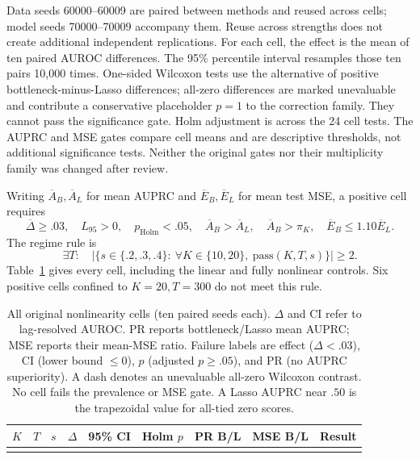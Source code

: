 Data seeds 60000--60009 are paired between methods and reused across cells;
model seeds 70000--70009 accompany them. Reuse across strengths does not
create additional independent replications. For each cell, the effect is
the mean of ten paired AUROC differences. The 95\% percentile interval
resamples those ten pairs 10,000 times. One-sided Wilcoxon tests use the
alternative of positive bottleneck-minus-Lasso differences; all-zero
differences are marked unevaluable and contribute a conservative placeholder
$p=1$ to the correction family. They cannot pass the significance gate.
Holm adjustment is across the 24 cell tests.
The AUPRC and MSE gates compare cell means and are descriptive thresholds,
not additional significance tests. Neither the original gates nor their
multiplicity family was changed after review.

Writing $\overline{A}_B,\overline{A}_L$ for mean AUPRC and
$\overline{E}_B,\overline{E}_L$ for mean test MSE, a positive cell requires
\[
\overline{\Delta}\geq .03,\quad L_{95}>0,\quad p_{\mathrm{Holm}}<.05,
\quad\overline{A}_B>\overline{A}_L,\quad\overline{A}_B>\pi_K,
\quad\overline{E}_B\leq1.10\overline{E}_L.
\]
The regime rule is
\[
\exists T:\quad
\left|\{s\in\{.2,.3,.4\}:\ \forall K\in\{10,20\},\
\mathrm{pass}(K,T,s)\}\right|\geq2.
\]
Table~\ref{tab:gates} gives every cell, including the linear and fully
nonlinear controls. Six positive cells confined to $K=20,T=300$ do not meet
this rule.

\begin{table}[ht]
\centering\footnotesize
\setlength{\tabcolsep}{3pt}
\caption{All original nonlinearity cells (ten paired seeds each).
$\Delta$ and CI refer to lag-resolved AUROC. PR reports bottleneck/Lasso
mean AUPRC; MSE reports their mean-MSE ratio. Failure labels are effect
($\Delta<.03$), CI (lower bound $\leq0$), $p$ (adjusted $p\geq.05$),
and PR (no AUPRC superiority). A dash denotes an unevaluable all-zero
Wilcoxon contrast. No cell fails the prevalence or MSE gate. A Lasso AUPRC
near $.50$ is the trapezoidal value for all-tied zero scores.}
\label{tab:gates}
\begin{tabular}{rrrrlllll}
\toprule
$K$ & $T$ & $s$ & $\Delta$ & 95\% CI & Holm $p$ & PR B/L & MSE B/L & Result \\
\midrule
\NonlinearityGateRows
\bottomrule
\end{tabular}
\end{table}

